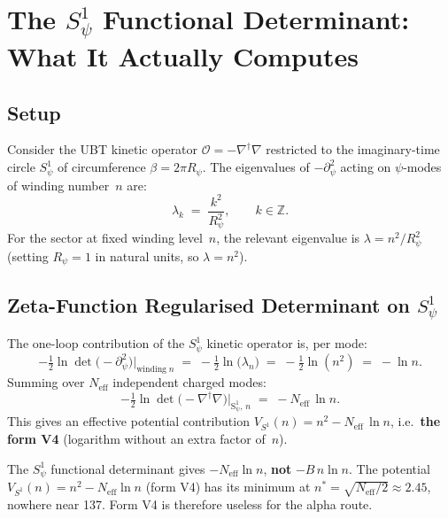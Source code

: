 \documentclass[12pt,a4paper]{article}
\theoremstyle{definition}
\theoremstyle{remark}
\newcommand{\ZZ}{\mathbb{Z}}
\newcommand{\Neff}{N_{\mathrm{eff}}}
\begin{document}
\section{The $S^1_\psi$ Functional Determinant: What It Actually Computes}
\label{sec:nlogn:S1det}

\subsection{Setup}
\label{ssec:nlogn:S1setup}

Consider the UBT kinetic operator
$\mathcal{O} = -\nabla^\dagger\nabla$ restricted to the imaginary-time circle
$S^1_\psi$ of circumference $\beta = 2\pi R_\psi$.
The eigenvalues of $-\partial^2_\psi$ acting on $\psi$-modes of winding
number~$n$ are:
\begin{equation}
  \lambda_k \;=\; \frac{k^2}{R_\psi^2}, \qquad k \in \ZZ.
  \label{eq:nlogn:eigenvalues}
\end{equation}
For the sector at fixed winding level~$n$, the relevant eigenvalue is
$\lambda = n^2/R_\psi^2$ (setting $R_\psi = 1$ in natural units, so
$\lambda = n^2$).

\subsection{Zeta-Function Regularised Determinant on $S^1_\psi$}
\label{ssec:nlogn:zeta}

The one-loop contribution of the $S^1_\psi$ kinetic operator is, per mode:
\begin{equation}
  -\tfrac{1}{2}\ln\det\bigl(-\partial^2_\psi\bigr)\big|_{\mathrm{winding}\;n}
  \;=\;
  -\tfrac{1}{2}\ln\bigl(\lambda_n\bigr)
  \;=\;
  -\tfrac{1}{2}\ln(n^2)
  \;=\;
  -\ln n.
  \label{eq:nlogn:lndet_single}
\end{equation}
Summing over $\Neff$ independent charged modes:
\begin{equation}
  \boxed{
  -\tfrac{1}{2}\ln\det\bigl(-\nabla^\dagger\nabla\bigr)\big|_{\mathrm{S^1_\psi},\,n}
  \;=\;
  -\Neff\,\ln n.
  }
  \label{eq:nlogn:lndet_Neff}
\end{equation}
This gives an effective potential contribution $V_{S^1}(n) = n^2 - \Neff\,\ln n$,
i.e.\ \textbf{the form V4} (logarithm without an extra factor of~$n$).

\begin{warnbox}
The $S^1_\psi$ functional determinant gives $-\Neff\ln n$, \textbf{not}
$-B\,n\ln n$.  The potential $V_{S^1}(n) = n^2 - \Neff\ln n$ (form V4) has
its minimum at $n^* = \sqrt{\Neff/2} \approx 2.45$, nowhere near 137.
Form V4 is therefore useless for the alpha route.
\end{warnbox}
\end{document}
